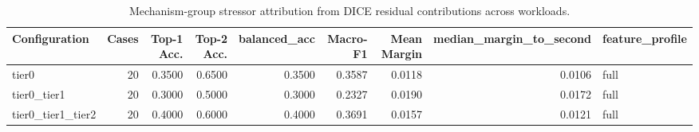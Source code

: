 \begin{table}[t]
\centering
\caption{Mechanism-group stressor attribution from DICE residual contributions across workloads.}
\label{tab:dice_stressor_diagnosis}
\footnotesize
\begin{tabular}{lrrrrrrrl}
\toprule
Configuration & Cases & Top-1 Acc. & Top-2 Acc. & balanced_acc & Macro-F1 & Mean Margin & median_margin_to_second & feature_profile \\
\midrule
tier0 & 20 & 0.3500 & 0.6500 & 0.3500 & 0.3587 & 0.0118 & 0.0106 & full \\
tier0_tier1 & 20 & 0.3000 & 0.5000 & 0.3000 & 0.2327 & 0.0190 & 0.0172 & full \\
tier0_tier1_tier2 & 20 & 0.4000 & 0.6000 & 0.4000 & 0.3691 & 0.0157 & 0.0121 & full \\
\bottomrule
\end{tabular}

\end{table}
